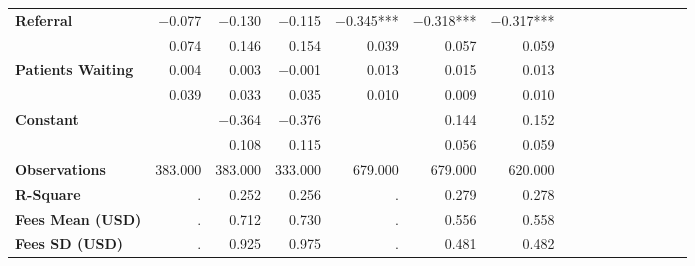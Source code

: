 \begin{tabular}{@{\extracolsep{5pt}}lrrrrrrrrrrrrrrr}
{\bf Referral} & $-$0.077\phantom{\phantom{)}***} & $-$0.130\phantom{\phantom{)}***} & $-$0.115\phantom{\phantom{)}***} & $-$0.345\phantom{)}*** & $-$0.318\phantom{)}*** & $-$0.317\phantom{)}*** \\
{\bf } & 0.074\phantom{\phantom{)}***} & 0.146\phantom{\phantom{)}***} & 0.154\phantom{\phantom{)}***} & 0.039\phantom{\phantom{)}***} & 0.057\phantom{\phantom{)}***} & 0.059\phantom{\phantom{)}***} \\
{\bf Patients Waiting} & 0.004\phantom{\phantom{)}***} & 0.003\phantom{\phantom{)}***} & $-$0.001\phantom{\phantom{)}***} & 0.013\phantom{\phantom{)}***} & 0.015\phantom{\phantom{)}***} & 0.013\phantom{\phantom{)}***} \\
{\bf } & 0.039\phantom{\phantom{)}***} & 0.033\phantom{\phantom{)}***} & 0.035\phantom{\phantom{)}***} & 0.010\phantom{\phantom{)}***} & 0.009\phantom{\phantom{)}***} & 0.010\phantom{\phantom{)}***} \\
{\bf Constant} & \phantom{***} & $-$0.364\phantom{\phantom{)}***} & $-$0.376\phantom{\phantom{)}***} & \phantom{***} & 0.144\phantom{\phantom{)}***} & 0.152\phantom{\phantom{)}***} \\
{\bf } & \phantom{***} & 0.108\phantom{\phantom{)}***} & 0.115\phantom{\phantom{)}***} & \phantom{***} & 0.056\phantom{\phantom{)}***} & 0.059\phantom{\phantom{)}***} \\
{\bf Observations} & 383.000\phantom{\phantom{)}***} & 383.000\phantom{\phantom{)}***} & 333.000\phantom{\phantom{)}***} & 679.000\phantom{\phantom{)}***} & 679.000\phantom{\phantom{)}***} & 620.000\phantom{\phantom{)}***} \\
{\bf R-Square} & .\phantom{***} & 0.252\phantom{***} & 0.256\phantom{***} & .\phantom{***} & 0.279\phantom{***} & 0.278\phantom{***} \\
{\bf Fees Mean (USD)} & .\phantom{***} & 0.712\phantom{***} & 0.730\phantom{***} & .\phantom{***} & 0.556\phantom{***} & 0.558\phantom{***} \\
{\bf Fees SD (USD)} & .\phantom{***} & 0.925\phantom{***} & 0.975\phantom{***} & .\phantom{***} & 0.481\phantom{***} & 0.482\phantom{***} \\
\hline
\end{tabular}
